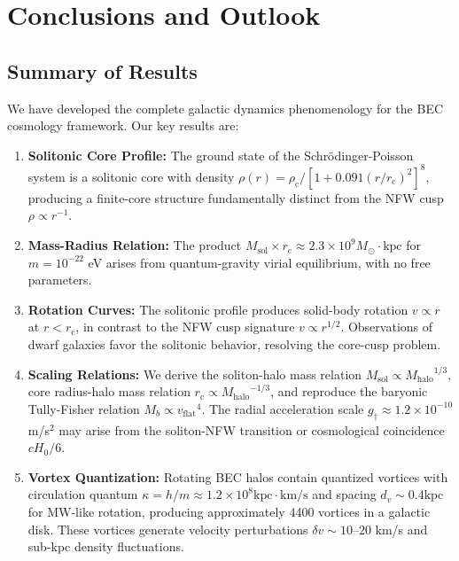 \documentclass[11pt,a4paper]{article}
\newcommand{\Msun}{\ensuremath{M_\odot}}
\newcommand{\Msol}{\ensuremath{M_{\mathrm{sol}}}}
\newcommand{\Mhalo}{\ensuremath{M_{\mathrm{halo}}}}
\newcommand{\kpc}{\ensuremath{\mathrm{kpc}}}
\newcommand{\rc}{\ensuremath{r_{\mathrm{c}}}}
\newcommand{\rhoc}{\ensuremath{\rho_{\mathrm{c}}}}
\newcommand{\vflat}{\ensuremath{v_{\mathrm{flat}}}}
\newcommand{\gdagger}{\ensuremath{g_{\dagger}}}
\theoremstyle{definition}
\theoremstyle{remark}
\begin{document}
\section{Conclusions and Outlook}
\label{sec:conclusions}

\subsection{Summary of Results}
\label{sec:summary}

We have developed the complete galactic dynamics phenomenology for the BEC cosmology framework. Our key results are:

\begin{enumerate}[leftmargin=*, itemsep=0.3em]

\item \textbf{Solitonic Core Profile:} The ground state of the Schr\"odinger-Poisson system is a solitonic core with density $\rho(r) = \rhoc/[1 + 0.091(r/\rc)^2]^8$, producing a finite-core structure fundamentally distinct from the NFW cusp $\rho \propto r^{-1}$.

\item \textbf{Mass-Radius Relation:} The product $\Msol \times \rc \approx 2.3 \times 10^9 \Msun \cdot \kpc$ for $m = 10^{-22}$ eV arises from quantum-gravity virial equilibrium, with no free parameters.

\item \textbf{Rotation Curves:} The solitonic profile produces solid-body rotation $v \propto r$ at $r < \rc$, in contrast to the NFW cusp signature $v \propto r^{1/2}$. Observations of dwarf galaxies favor the solitonic behavior, resolving the core-cusp problem.

\item \textbf{Scaling Relations:} We derive the soliton-halo mass relation $\Msol \propto \Mhalo^{1/3}$, core radius-halo mass relation $\rc \propto \Mhalo^{-1/3}$, and reproduce the baryonic Tully-Fisher relation $M_b \propto \vflat^4$. The radial acceleration scale $\gdagger \approx 1.2 \times 10^{-10}$ m/s$^2$ may arise from the soliton-NFW transition or cosmological coincidence $cH_0/6$.

\item \textbf{Vortex Quantization:} Rotating BEC halos contain quantized vortices with circulation quantum $\kappa = h/m \approx 1.2 \times 10^8 \kpc \cdot \text{km/s}$ and spacing $d_v \sim 0.4 \kpc$ for MW-like rotation, producing approximately 4400 vortices in a galactic disk. These vortices generate velocity perturbations $\delta v \sim 10$--$20$ km/s and sub-kpc density fluctuations.


\end{enumerate}
\end{document}
